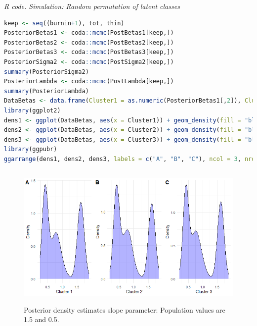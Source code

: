 \begin{enumerate}[leftmargin=*]
\begin{tcolorbox}[enhanced,width=4.67in,center upper,
	fontupper=\large\bfseries,drop shadow southwest,sharp corners]
	\textit{R code. Simulation: Random permutation of latent classes}
	\begin{VF}
		\begin{lstlisting}[language=R]
keep <- seq((burnin+1), tot, thin)
PosteriorBetas1 <- coda::mcmc(PostBetas1[keep,])
PosteriorBetas2 <- coda::mcmc(PostBetas2[keep,])
PosteriorBetas3 <- coda::mcmc(PostBetas3[keep,])
PosteriorSigma2 <- coda::mcmc(PostSigma2[keep,])
summary(PosteriorSigma2)
PosteriorLambda <- coda::mcmc(PostLambda[keep,])
summary(PosteriorLambda)
DataBetas <- data.frame(Cluster1 = as.numeric(PosteriorBetas1[,2]), Cluster2 = as.numeric(PosteriorBetas2[,2]), Cluster3 = as.numeric(PosteriorBetas3[,2])) 
library(ggplot2)
dens1 <- ggplot(DataBetas, aes(x = Cluster1)) + geom_density(fill = "blue", alpha = 0.3) + labs(x = "Cluster 1", y = "Density") + theme_minimal()
dens2 <- ggplot(DataBetas, aes(x = Cluster2)) + geom_density(fill = "blue", alpha = 0.3) +  labs(x = "Cluster 2", y = "Density") + theme_minimal()
dens3 <- ggplot(DataBetas, aes(x = Cluster3)) + geom_density(fill = "blue", alpha = 0.3) +  labs(x = "Cluster 3", y = "Density") + theme_minimal()
library(ggpubr)
ggarrange(dens1, dens2, dens3, labels = c("A", "B", "C"), ncol = 3, nrow = 1, legend = "bottom", common.legend = TRUE)
	\end{lstlisting}
	\end{VF}
\end{tcolorbox}

\begin{figure}[!h]
	\includegraphics[width=340pt, height=200pt]{Chapters/chapter11/figures/PosteRP.png}
	\caption[List of figure caption goes here]{Posterior density estimates slope parameter: Population values are 1.5 and 0.5.}\label{figPost}
\end{figure}


\end{enumerate}
